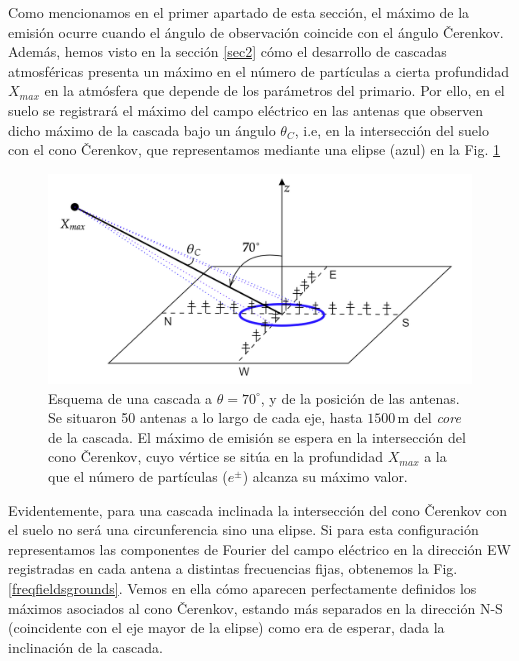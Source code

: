 \documentclass[11 pt, a4paper]{article} %
\numberwithin{equation}{section}
\numberwithin{figure}{section}
\numberwithin{table}{section}
\begin{document}
Como mencionamos en el primer apartado de esta sección, el máximo de la emisión ocurre cuando el ángulo de observación coincide con el ángulo \v{C}erenkov. Además, hemos visto en la sección \ref{sec2} cómo el desarrollo de cascadas atmosféricas presenta un máximo en el número de partículas a cierta profundidad $X_{max}$ en la atmósfera que depende de los parámetros del primario. Por ello, en el suelo se registrará el máximo del campo eléctrico en las antenas que observen dicho máximo de la cascada bajo un ángulo $\theta_C$, i.e, en la intersección del suelo con el cono \v{C}erenkov, que representamos mediante una elipse (azul) en la Fig. \ref{ANITApaper_showscheme}
\begin{figure}[H]
	\centering
	\includegraphics[width=.75\linewidth]{figures/radio/ANITApaper_showscheme}
	\caption{Esquema de una cascada a $\theta=70^\circ$, y de la posición de las antenas. Se situaron 50 antenas a lo largo de cada eje, hasta $1500\,\mathrm{m}$ del \textit{core} de la cascada. El máximo de emisión se espera en la intersección del cono \v{C}erenkov, cuyo vértice se sitúa en la profundidad $X_{max}$ a la que el número de partículas ($e^\pm$) alcanza su máximo valor.}
	\label{ANITApaper_showscheme}
\end{figure}

Evidentemente, para una cascada inclinada la intersección del cono \v{C}erenkov con el suelo no será una circunferencia sino una elipse. Si para esta configuración representamos las componentes de Fourier del campo eléctrico en la dirección EW registradas en cada antena a distintas frecuencias fijas, obtenemos la Fig. \ref{freqfieldsgrounds}. Vemos en ella cómo aparecen perfectamente definidos los máximos asociados al cono \v{C}erenkov, estando más separados en la dirección N-S (coincidente con el eje mayor de la elipse) como era de esperar, dada la inclinación de la cascada.
\end{document}
